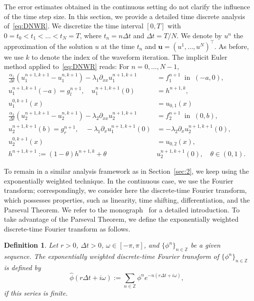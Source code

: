 \documentclass[10pt,a4paper]{amsart}
\newtheorem{definition}{Definition}
\begin{document}
The error estimates obtained in the continuous setting do not clarify the influence of the time step size. In this section, we provide a detailed time discrete analysis of~\eqref{eq:DNWR}. We discretize the time interval $[0, T]$ with $0=t_0 < t_1 < \ldots < t_N = T$, where $t_n = n\Delta t$ and $\Delta t = T/N$. We denote by $u^n$ the approximation of the solution $u$ at the time $t_n$ and $\boldsymbol{u} = (u^1, \ldots, u^N)^\top$. As before, we use $k$ to denote the index of the waveform iteration. The implicit Euler method applied to~\eqref{eq:DNWR} reads: For $n=0, \ldots, N-1$,
\begin{equation}\label{eq:DNWRIE}
	\begin{aligned}
		\frac{\alpha_1}{\Delta t} (u_1^{n+1, k+1} - u_1^{n, k+1}) - \lambda_1 \partial_{xx} u_1^{n+1, k+1} &= f_1^{n+1} \ \text{ in } \ (-a,0) , \\
		u_1^{n+1, k+1}(-a) = g_l^{n+1}, \quad 
		u_1^{n+1, k+1}(0) &= h^{n+1, k},\\
		u_1^{0, k+1}(x) &= u_{0, 1}(x) \\
		\frac{\alpha_2}{\Delta t} (u_2^{n+1, k+1}-u_2^{n, k+1})-\lambda_2 \partial_{xx} u_2^{n+1, k+1} &= f_2^{n+1} \ \text{ in } \ (0,b),\\
		u_2^{n+1,k+1}(b) = g_r^{n+1}, \quad
		-\lambda_1 \partial_x u_1^{n+1, k+1}(0) &= -\lambda_2 \partial_x u_2^{n+1, k+1}(0), \\
		u_2^{0, k+1}(x) &= u_{0, 2}(x),\\
		h^{n+1, k+1} := (1-\theta) h^{n+1, k} + \theta &u^{n+1, k+1}_2(0),  \quad \theta\in(0, 1).
	\end{aligned}
	\tag{DNWR-IE}
\end{equation}


To remain in a similar analysis framework as in Section~\ref{sec:2}, we keep using the exponentially weighted technique. In the continuous case, we use the Fourier transform; correspondingly, we consider here the discrete-time Fourier transform, which possesses properties, such as linearity, time shifting, differentiation, and the Parseval Theorem. We refer to the monograph~\cite[Chapter 2.9]{Oppenheim1999} for a detailed introduction. To take advantage of the Parseval Theorem, we define the exponentially weighted discrete-time Fourier transform as follows.


\begin{definition}\label{def:DiscFourier}
Let $r>0$, $\Delta t>0$, $\omega \in [-\pi, \pi]$,  and $\{\phi^n\}_{n\in\mathbb{Z}}$ be a given sequence. 
The exponentially weighted discrete-time Fourier transform of $\{\phi^n\}_{n\in\mathbb{Z}}$ is defined by
\[\widehat{\phi}(r\Delta t + i \omega) := \sum_{n\in\mathbb{Z}} \phi^n e^{-n(r\Delta t+i\omega)},\]
if this series is finite. 
\end{definition}
\end{document}

